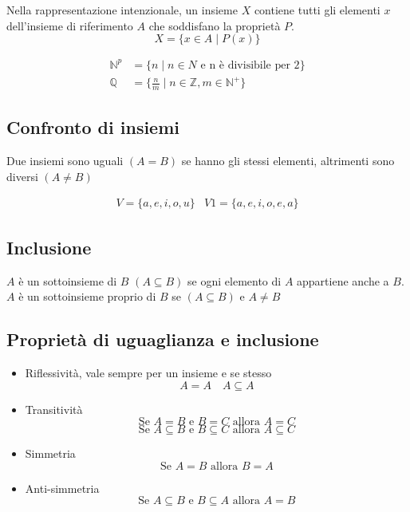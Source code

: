 \documentclass{article}
\begin{document}
Nella rappresentazione intenzionale, un insieme \(X\) contiene tutti gli elementi \(x\) dell'insieme di riferimento \(A\) che soddisfano la proprietà \(P\).
\[X = \{ x \in A \mid P(x) \}\]

\begin{eg}
    \begin{align*}
        \mathbb{N}^p & = \{n \mid n \in N \text{ e n è divisibile per 2} \}         \\
        \mathbb{Q}   & = \{\frac{n}{m} \mid n \in \mathbb{Z}, m \in \mathbb{N}^+ \}
    \end{align*}
    \[\]
\end{eg}

\subsection{Confronto di insiemi}
\begin{dfn}
    Due insiemi sono uguali \((A = B)\) se hanno gli stessi elementi, altrimenti sono diversi \((A \not= B)\)
\end{dfn}

\begin{eg}
    \begin{align*}
        V = \{a,e,i,o,u\} & V1 = \{a,e,i,o,e,a\}
    \end{align*}
\end{eg}

\subsection{Inclusione}
\begin{dfn}
    \(A\) è un sottoinsieme di \(B\) \((A \subseteq B)\) se ogni elemento di \(A\) appartiene anche a \(B\).
    \(A\) è un sottoinsieme proprio di \(B\) se  \((A \subseteq B) \text{ e } A \neq B\)
\end{dfn}

\subsection{Proprietà di uguaglianza e inclusione}
\begin{itemize}
    \item Riflessività, vale sempre per un insieme e se stesso
          \[A = A \quad A \subseteq A\]
    \item Transitività
          \[\text{Se } A = B \text{ e } B = C \text{ allora } A = C\]
          \[\text{Se } A \subseteq B \text{ e } B \subseteq C \text{ allora } A \subseteq C\]
    \item Simmetria
          \[\text{Se } A = B \text{ allora } B = A\]
    \item Anti-simmetria
          \[\text{Se } A \subseteq B \text{ e } B \subseteq A \text{ allora } A = B\]
\end{itemize}
\end{document}
